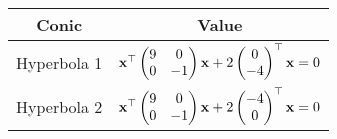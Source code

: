 \begin{tabular}{|c|c|}
\hline
Conic & Value \\
\hline
Hyperbola 1 & $\mathbf{x}^\top \begin{pmatrix}9 & 0 \\ 0 & -1\end{pmatrix} \mathbf{x} + 2\begin{pmatrix}0\\-4\end{pmatrix}^\top\mathbf{x} = 0$ \\
\hline
Hyperbola 2 & $\mathbf{x}^\top \begin{pmatrix}9 & 0 \\ 0 & -1\end{pmatrix} \mathbf{x} + 2\begin{pmatrix}-4\\0\end{pmatrix}^\top\mathbf{x} = 0$ \\
\hline
\end{tabular}
